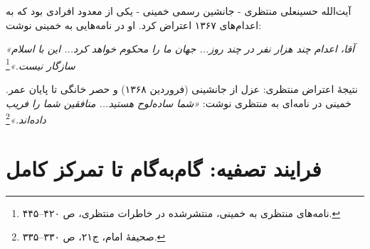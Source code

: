 \documentclass[12pt,a4paper]{book}
\begin{document}
\begin{noteBox}
آیت‌الله حسینعلی منتظری - جانشین رسمی خمینی - یکی از معدود افرادی بود که به اعدام‌های ۱۳۶۷ اعتراض کرد. او در نامه‌هایی به خمینی نوشت:

\textit{«آقا، اعدام چند هزار نفر در چند روز... جهان ما را محکوم خواهد کرد... این با اسلام سازگار نیست.»}\footnote{نامه‌های منتظری به خمینی، منتشرشده در خاطرات منتظری، ص ۴۲۰–۴۴۵.}

نتیجهٔ اعتراض منتظری: عزل از جانشینی (فروردین ۱۳۶۸) و حصر خانگی تا پایان عمر. خمینی در نامه‌ای به منتظری نوشت: \textit{«شما ساده‌لوح هستید... منافقین شما را فریب داده‌اند.»}\footnote{صحیفهٔ امام، ج۲۱، ص ۳۳۰–۳۳۵.}
\end{noteBox}

\section{فرایند تصفیه: گام‌به‌گام تا تمرکز کامل}
\end{document}
